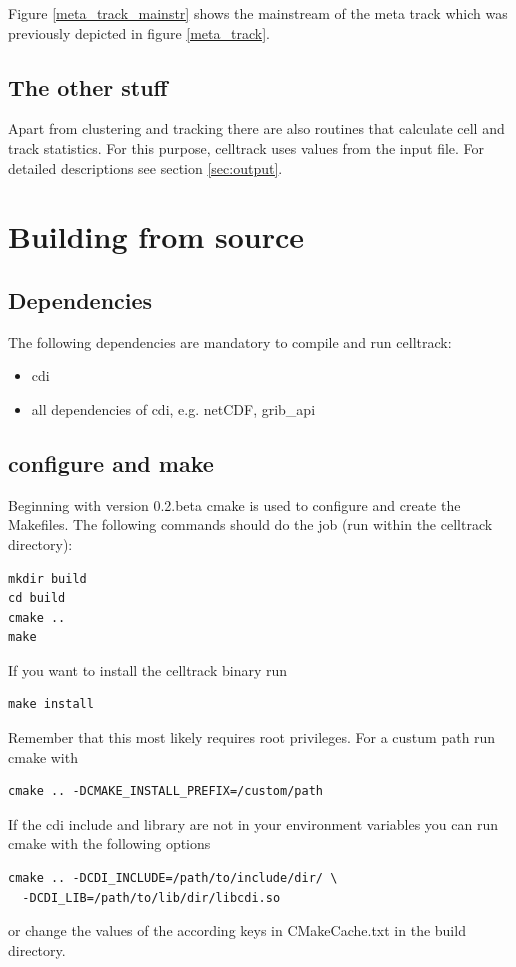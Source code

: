 \documentclass{scrartcl}
\begin{document}
Figure \ref{meta_track_mainstr} shows the mainstream of the meta track which was previously depicted in figure \ref{meta_track}.  

\subsection{The other stuff}
Apart from clustering and tracking there are also routines that calculate cell and track statistics. For this purpose, celltrack uses values from the input file. For detailed descriptions see section \ref{sec:output}.

\section{Building from source}
\subsection{Dependencies}
The following dependencies are mandatory to compile and run celltrack:
\begin{itemize}
	\item cdi
	\item all dependencies of cdi, e.g. netCDF, grib\_api
\end{itemize}

\subsection{configure and make}
Beginning with version 0.2.beta cmake is used to configure and create the Makefiles. The following commands should do the job (run within the celltrack directory):
\begin{verbatim}
mkdir build
cd build
cmake ..
make
\end{verbatim}
If you want to install the celltrack binary run
\begin{verbatim}
make install
\end{verbatim}
Remember that this most likely requires root privileges. For a custum path run cmake with 
\begin{verbatim}
cmake .. -DCMAKE_INSTALL_PREFIX=/custom/path
\end{verbatim}
If the cdi include and library are not in your environment variables you can run cmake with the following options
\begin{verbatim}
cmake .. -DCDI_INCLUDE=/path/to/include/dir/ \
  -DCDI_LIB=/path/to/lib/dir/libcdi.so
\end{verbatim}
or change the values of the according keys in CMakeCache.txt in the build directory.
\end{document}
